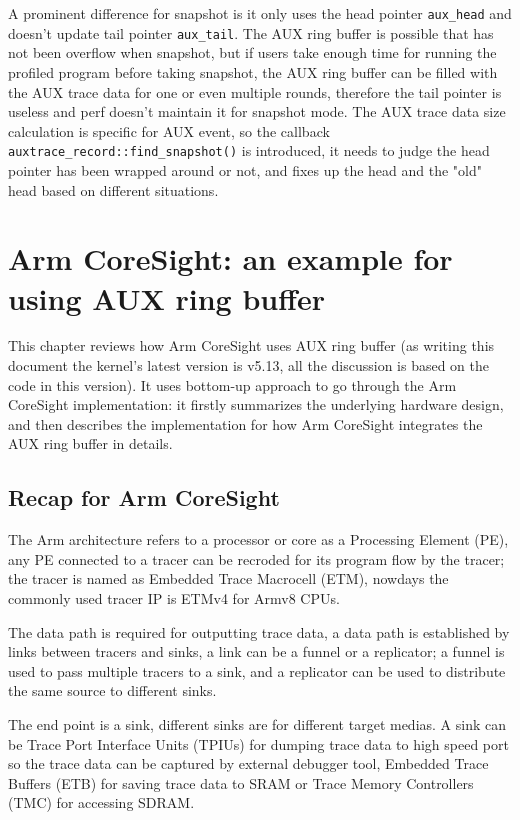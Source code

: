 \documentclass[11pt]{diazessay} %
\def\code#1{\texttt{#1}}
\begin{document}
A prominent difference for snapshot is it only uses the head pointer \code{aux\_head} and doesn't update tail pointer \code{aux\_tail}.  The AUX ring buffer is possible that has not been overflow when snapshot, but if users take enough time for running the profiled program before taking snapshot, the AUX ring buffer can be filled with the AUX trace data for one or even multiple rounds, therefore the tail pointer is useless and perf doesn't maintain it for snapshot mode.  The AUX trace data size calculation is specific for AUX event, so the callback \code{auxtrace\_record::find\_snapshot()} is introduced, it needs to judge the head pointer has been wrapped around or not, and fixes up the head and the "old" head based on different situations.

\section*{Arm CoreSight: an example for using AUX ring buffer}

This chapter reviews how Arm CoreSight uses AUX ring buffer (as writing this document the kernel's latest version is v5.13, all the discussion is based on the code in this version).  It uses bottom-up approach to go through the Arm CoreSight implementation: it firstly summarizes the underlying hardware design, and then describes the implementation for how Arm CoreSight integrates the AUX ring buffer in details.

\subsection*{Recap for Arm CoreSight}

The Arm architecture refers to a processor or core as a Processing Element (PE), any PE connected to a tracer can be recroded for its program flow by the tracer; the tracer is named as Embedded Trace Macrocell (ETM), nowdays the commonly used tracer IP is ETMv4 for Armv8 CPUs.

The data path is required for outputting trace data, a data path is established by links between tracers and sinks, a link can be a funnel or a replicator; a funnel is used to pass multiple tracers to a sink, and a replicator can be used to distribute the same source to different sinks.

The end point is a sink, different sinks are for different target medias.  A sink can be Trace Port Interface Units (TPIUs) for dumping trace data to high speed port so the trace data can be captured by external debugger tool, Embedded Trace Buffers (ETB) for saving trace data to SRAM or Trace Memory Controllers (TMC) for accessing SDRAM.
\end{document}
